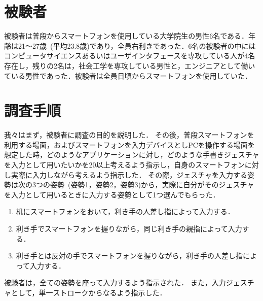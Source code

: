 \section{被験者}
被験者は普段からスマートフォンを使用している大学院生の男性6名である．年齢は21〜27歳~(平均23.8歳)であり，全員右利きであった．6名の被験者の中にはコンピュータサイエンスあるいはユーザインタフェースを専攻している人が4名存在し，残りの2名は，社会工学を専攻している男性と，エンジニアとして働いている男性であった．被験者は全員日頃からスマートフォンを使用していた．



\section{調査手順}
我々はまず，被験者に調査の目的を説明した．
その後，普段スマートフォンを利用する場面，およびスマートフォンを入力デバイスとしPCを操作する場面を想定した時，どのようなアプリケーションに対し，どのような手書きジェスチャを入力として用いたいかを20以上考えるよう指示し，自身のスマートフォンに対し実際に入力しながら考えるよう指示した．
その際，ジェスチャを入力する姿勢は次の3つの姿勢~(姿勢1，姿勢2，姿勢3)から，実際に自分がそのジェスチャを入力として用いるときに入力する姿勢として1つ選んでもらった．
\begin{enumerate}
\item 机にスマートフォンをおいて，利き手の人差し指によって入力する．
\item 利き手でスマートフォンを握りながら，同じ利き手の親指によって入力する．
\item 利き手とは反対の手でスマートフォンを握りながら，利き手の人差し指によって入力する．
\end{enumerate}
被験者は，全ての姿勢を座って入力するよう指示された．
また，入力ジェスチャとして，単一ストロークからなるよう指示した．

